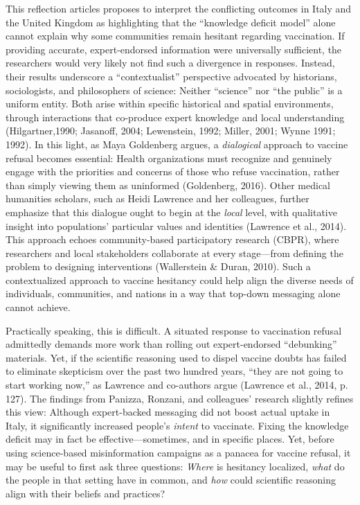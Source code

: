\documentclass[authordate, reflection,issue]{jote-new-article}
\begin{document}
	This reflection articles proposes to interpret the conflicting outcomes in Italy and the United Kingdom as highlighting that the “knowledge deficit model” alone cannot explain why some communities remain hesitant regarding vaccination. If providing accurate, expert-endorsed information were universally sufficient, the researchers would very likely not find such a divergence in responses. Instead, their results underscore a “contextualist” perspective advocated by historians, sociologists, and philosophers of science: Neither “science” nor “the public” is a uniform entity. Both arise within specific historical and spatial environments, through interactions that co-produce expert knowledge and local understanding (Hilgartner,1990; Jasanoff, 2004; Lewenstein, 1992; Miller, 2001; Wynne 1991; 1992). In this light, as Maya Goldenberg argues, a \emph{dialogical} approach to vaccine refusal becomes essential: Health organizations must recognize and genuinely engage with the priorities and concerns of those who refuse vaccination, rather than simply viewing them as uninformed (Goldenberg, 2016). Other medical humanities scholars, such as Heidi Lawrence and her colleagues, further emphasize that this dialogue ought to begin at the \emph{local} level, with qualitative insight into populations' particular values and identities (Lawrence et al., 2014). This approach echoes community-based participatory research (CBPR), where researchers and local stakeholders collaborate at every stage—from defining the problem to designing interventions (Wallerstein \& Duran, 2010). Such a contextualized approach to vaccine hesitancy could help align the diverse needs of individuals, communities, and nations in a way that top-down messaging alone cannot achieve.







	Practically speaking, this is difficult. A situated response to vaccination refusal admittedly demands more work than rolling out expert-endorsed “debunking” materials. Yet, if the scientific reasoning used to dispel vaccine doubts has failed to eliminate skepticism over the past two hundred years, “they are not going to start working now,” as Lawrence and co-authors argue (Lawrence et al., 2014, p. 127). The findings from Panizza, Ronzani, and colleagues' research slightly refines this view: Although expert-backed messaging did not boost actual uptake in Italy, it significantly increased people's \emph{intent} to vaccinate. Fixing the knowledge deficit may in fact be effective—sometimes, and in specific places. Yet, before using science-based misinformation campaigns as a panacea for vaccine refusal, it may be useful to first ask three questions: \emph{Where} is hesitancy localized, \emph{what} do the people in that setting have in common, and \emph{how} could scientific reasoning align with their beliefs and practices?
\end{document}
